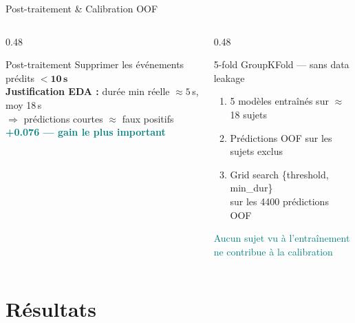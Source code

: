 \documentclass[aspectratio=169, 10pt]{beamer}
\begin{document}
\begin{frame}{Post-traitement \& Calibration OOF}
    \begin{columns}[T]
        \begin{column}{0.48\textwidth}
            \begin{block}{\small Post-traitement}
                \small Supprimer les événements prédits $<\mathbf{10\,s}$\\[2pt]
                \textbf{Justification EDA :} durée min réelle $\approx5$\,s, moy 18\,s\\
                $\Rightarrow$ prédictions courtes $\approx$ faux positifs\\[2pt]
                \textcolor{Teal}{\textbf{+0.076 --- gain le plus important}}
            \end{block}
        \end{column}
        \begin{column}{0.48\textwidth}
            \begin{block}{\small 5-fold GroupKFold --- sans data leakage}
                \small
                \begin{enumerate}\setlength\itemsep{1pt}
                    \item 5 modèles entraînés sur $\approx$18 sujets
                    \item Prédictions OOF sur les sujets exclus
                    \item Grid search \{threshold, min\_dur\}\\
                          sur les 4400 prédictions OOF
                \end{enumerate}
                \textcolor{Teal}{Aucun sujet vu à l'entraînement}\\
                \textcolor{Teal}{ne contribue à la calibration}
            \end{block}
        \end{column}
    \end{columns}
\end{frame}

\section{Résultats}
\end{document}
